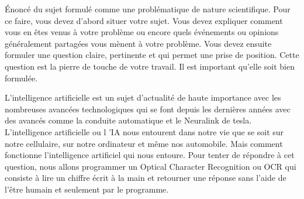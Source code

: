 Énoncé du sujet formulé comme une problématique de nature scientifique. Pour ce faire, vous devez
d’abord situer votre sujet. Vous devez expliquer comment vous en êtes venus à votre problème ou encore
quels événements ou opinions généralement partagées vous mènent à votre problème. Vous devez ensuite
formuler une question claire, pertinente et qui permet une prise de position. Cette question est la pierre
de touche de votre travail. Il est important qu’elle soit bien formulée. 

L'intelligence artificielle est un sujet d'actualité de haute importance avec les nombreuses avancées 
technologiques qui se font depuis les dernières années avec des avancés comme la conduite automatique et le Neuralink
de tesla. L'intelligence artificielle ou l 'IA nous entourent dans notre vie que se soit sur notre cellulaire, sur notre ordinateur
et même nos automobile. Mais comment fonctionne l'intelligence artificiel qui nous entoure. Pour tenter de répondre à cet question, 
nous allons programmer un Optical Character Recognition ou OCR qui consiste à lire un chiffre écrit à la main et retourner une réponse 
sans l'aide de l'être humain et seulement par le programme.

